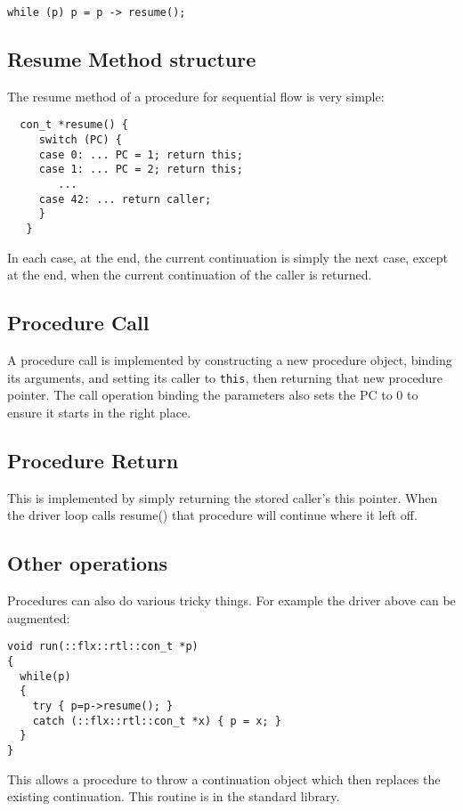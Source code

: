 \documentclass[oneside]{book}
\begin{document}
\begin{verbatim}
while (p) p = p -> resume();
\end{verbatim}

\subsection{Resume Method structure}
The resume method of a procedure for sequential flow is very simple:
\begin{verbatim}
  con_t *resume() {
     switch (PC) {
     case 0: ... PC = 1; return this;
     case 1: ... PC = 2; return this;
        ...
     case 42: ... return caller;
     }
   }
\end{verbatim}

In each case, at the end, the current continuation is simply the next case,
except at the end, when the current continuation of the caller is returned.

\subsection{Procedure Call}
A procedure call is implemented by constructing a new procedure object,
binding its arguments, and setting its caller to \verb$this$, then returning
that new procedure pointer. The call operation binding the parameters
also sets the PC to 0 to ensure it starts in the right place.

\subsection{Procedure Return}
This is implemented by simply returning the stored caller's this pointer.
When the driver loop calls resume() that procedure will continue where it left off.

\subsection{Other operations}
Procedures can also do various tricky things. For example the driver above
can be augmented:

\begin{verbatim}
void run(::flx::rtl::con_t *p)
{
  while(p)
  {
    try { p=p->resume(); }
    catch (::flx::rtl::con_t *x) { p = x; }
  }
}
\end{verbatim}

This allows a procedure to throw a continuation object which then replaces
the existing continuation. This routine is in the standard library.
\end{document}
